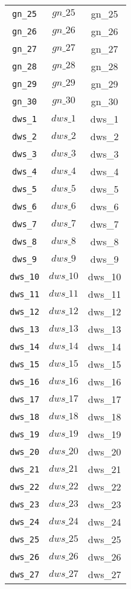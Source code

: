 \begin{center}
\begin{longtable}{ccc}
\texttt{gn\_25} & $gn\_25$ & gn\_25\\
\texttt{gn\_26} & $gn\_26$ & gn\_26\\
\texttt{gn\_27} & $gn\_27$ & gn\_27\\
\texttt{gn\_28} & $gn\_28$ & gn\_28\\
\texttt{gn\_29} & $gn\_29$ & gn\_29\\
\texttt{gn\_30} & $gn\_30$ & gn\_30\\
\texttt{dws\_1} & $dws\_1$ & dws\_1\\
\texttt{dws\_2} & $dws\_2$ & dws\_2\\
\texttt{dws\_3} & $dws\_3$ & dws\_3\\
\texttt{dws\_4} & $dws\_4$ & dws\_4\\
\texttt{dws\_5} & $dws\_5$ & dws\_5\\
\texttt{dws\_6} & $dws\_6$ & dws\_6\\
\texttt{dws\_7} & $dws\_7$ & dws\_7\\
\texttt{dws\_8} & $dws\_8$ & dws\_8\\
\texttt{dws\_9} & $dws\_9$ & dws\_9\\
\texttt{dws\_10} & $dws\_10$ & dws\_10\\
\texttt{dws\_11} & $dws\_11$ & dws\_11\\
\texttt{dws\_12} & $dws\_12$ & dws\_12\\
\texttt{dws\_13} & $dws\_13$ & dws\_13\\
\texttt{dws\_14} & $dws\_14$ & dws\_14\\
\texttt{dws\_15} & $dws\_15$ & dws\_15\\
\texttt{dws\_16} & $dws\_16$ & dws\_16\\
\texttt{dws\_17} & $dws\_17$ & dws\_17\\
\texttt{dws\_18} & $dws\_18$ & dws\_18\\
\texttt{dws\_19} & $dws\_19$ & dws\_19\\
\texttt{dws\_20} & $dws\_20$ & dws\_20\\
\texttt{dws\_21} & $dws\_21$ & dws\_21\\
\texttt{dws\_22} & $dws\_22$ & dws\_22\\
\texttt{dws\_23} & $dws\_23$ & dws\_23\\
\texttt{dws\_24} & $dws\_24$ & dws\_24\\
\texttt{dws\_25} & $dws\_25$ & dws\_25\\
\texttt{dws\_26} & $dws\_26$ & dws\_26\\
\texttt{dws\_27} & $dws\_27$ & dws\_27\\

\end{longtable}
\end{center}
